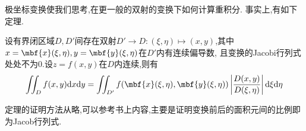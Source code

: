 \documentclass{ctexart}
\begin{document}
极坐标变换使我们思考,在更一般的双射的变换下如何计算重积分.
事实上,有如下定理.
\begin{formal}[2.3 二重积分的一般变量替换公式]
    设有界闭区域$D,D'$间存在双射$D'\to D:(\xi,\eta)\mapsto(x,y)$,其中$x=\mbf{x}(\xi,\eta),y=\mbf{y}(\xi,\eta)$在$D'$内有连续偏导数,
    且变换的Jacobi行列式处处不为$0$.设$z=f(x,y)$在$D$内连续,则有
    \[\iint_Df(x,y)\dx\di y=\iint_{D'}f(\mbf{x}(\xi,\eta),\mbf{y}(\xi,\eta))\left|\dfrac{D(x,y)}{D(\xi,\eta)}\right|\di\xi\di\eta\]
\end{formal}\noindent
定理的证明方法从略,可以参考书上内容,主要是证明变换前后的面积元间的比例即为Jacob行列式.
\end{document}
